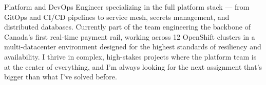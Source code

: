 Platform and DevOps Engineer specializing in the full platform stack — from GitOps and CI/CD pipelines to service mesh, secrets management, and distributed databases. Currently part of the team engineering the backbone of Canada's first real-time payment rail, working across 12 OpenShift clusters in a multi-datacenter environment designed for the highest standards of resiliency and availability. I thrive in complex, high-stakes projects where the platform team is at the center of everything, and I'm always looking for the next assignment that's bigger than what I've solved before.
\vspace{0.1cm} \par
